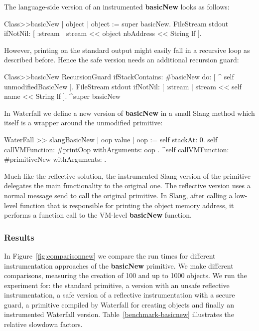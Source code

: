 \documentclass[10pt,preprint,letter]{sigplanconf}
\newcommand{\W}{Waterfall\xspace}
\begin{document}
The language-side version of an instrumented \textbf{basicNew} looks as follows: 
\begin{stcode}{}
Class>>basicNew
	| object |
	object := super basicNew.
	FileStream stdout ifNotNil: [ :stream |
		stream << object nbAddress << String lf ].
\end{stcode}
However, printing on the standard output might easily fall in a recursive loop as described before. 
Hence the safe version needs an additional recursion guard:
\begin{stcode}{}
Class>>basicNew
	RecursionGuard
	 	ifStackContains: #basicNew
		do: [ ^ self unmodifiedBasicNew ].
	FileStream stdout ifNotNil: [ :stream |
		stream << self name << String lf ].
	^super basicNew
\end{stcode}
\noindent In \W we define a new version of \textbf{basicNew} in a small Slang method which itself is a wrapper around the unmodified primitive: 

\begin{stcode}{} 
WaterFall >> slangBasicNew
	| oop value | 
	oop := self stackAt: 0. 
	self
		callVMFunction: #printOop 
		withArguments: { oop }.
	^self 
		callVMFunction: #primitiveNew 
		withArguments: {}.
\end{stcode}   

Much like the reflective solution, the instrumented Slang version of the primitive delegates the main functionality to the original one.
The reflective version uses a normal message send to call the original primitive. 
In Slang, after calling a low-level function that is responsible for printing the object memory address, it performs a function call to the VM-level \textbf{basicNew} function.







\subsubsection{Results}
In Figure~\ref{fig:comparisonnew} we compare the run times for different instrumentation approaches of the \textbf{basicNew} primitive. 
We make different comparisons, measuring the creation of 100 and up to 1000 objects. We run the experiment for: the standard primitive, a version with an unsafe reflective instrumentation, a safe version of a reflective instrumentation with a secure guard, a primitive compiled by \W for creating objects and finally an instrumented \W version.
Table~\ref{benchmark-basicnew} illustrates the relative slowdown factors.
\end{document}
